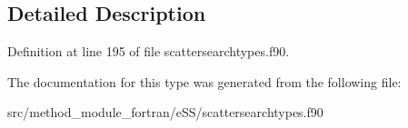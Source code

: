 \subsection{Detailed Description}


Definition at line 195 of file scattersearchtypes.\-f90.



The documentation for this type was generated from the following file\-:\begin{DoxyCompactItemize}
\item 
src/method\-\_\-module\-\_\-fortran/e\-S\-S/scattersearchtypes.\-f90\end{DoxyCompactItemize}
